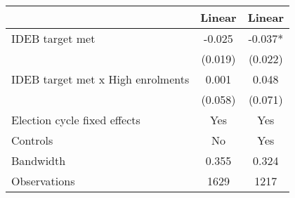 \begin{tabular}{lcc}
  \toprule
  & Linear & Linear \\ 
  \midrule
IDEB target met & -0.025 & -0.037* \\ 
   & (0.019) & (0.022) \\ 
  IDEB target met x High enrolments & 0.001 & 0.048 \\ 
   & (0.058) & (0.071) \\ 
  Election cycle fixed effects & Yes & Yes \\ 
  Controls & No & Yes \\ 
  Bandwidth & 0.355 & 0.324 \\ 
  Observations & 1629 & 1217 \\ 
   \bottomrule
\end{tabular}
